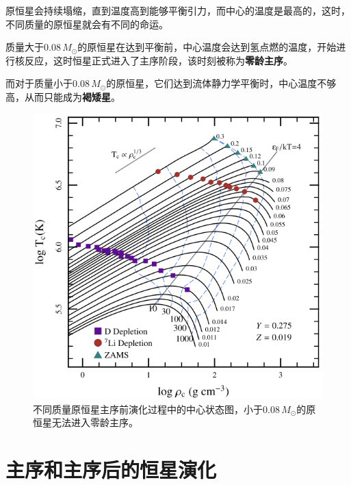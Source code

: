 \documentclass[openany]{ctexbook}
\begin{document}
原恒星会持续塌缩，直到温度高到能够平衡引力，而中心的温度是最高的，这时，不同质量的原恒星就会有不同的命运。

质量大于$0.08\,M_\odot$的原恒星在达到平衡前，中心温度会达到氢点燃的温度，开始进行核反应，这时恒星正式进入了主序阶段，该时刻被称为\textbf{零龄主序}。

而对于质量小于$0.08\,M_\odot$的原恒星，它们达到流体静力学平衡时，中心温度不够高，从而只能成为\textbf{褐矮星}。

\begin{figure}[hbt]
  \centering
  \includegraphics[width=12cm]{chapters/12/prems}
  \caption{不同质量原恒星主序前演化过程中的中心状态图，小于$0.08\,M_\odot$的原恒星无法进入零龄主序。}
  \label{}
\end{figure}

\chapter{主序和主序后的恒星演化}\label{sec:evolution}
\end{document}
